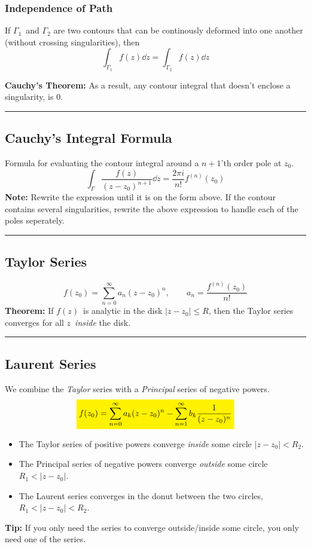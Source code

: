 \documentclass[10pt,a4paper]{article}
\newcommand{\holine}{\rule{286pt}{1pt}}
\newcommand{\yl}[1]{\colorbox{yellow}{$\displaystyle #1$}}
\begin{document}
\begin{multicols}{2}
\subsubsection*{Independence of Path}
If $\Gamma_1$ and $\Gamma_2$ are two contours that can be continously deformed into one another (without crossing singularities), then
\[
    \int_{\Gamma_1} f(z) \dd{z} = \int_{\Gamma_2} f(z) \dd{z}
\]

\textbf{Cauchy's Theorem:} As a result, any contour integral that doesn't enclose a singularity, is 0.


\holine
\subsection*{Cauchy's Integral Formula}
Formula for evaluating the contour integral around a $n+1$'th order pole at $z_0$.
\[
    \int_\Gamma \frac{f(z)}{(z-z_0)^{n+1}}\dd{z} = \frac{2\pi i}{n!}f^{(n)}(z_0)
\]
\textbf{Note:} Rewrite the expression until it is on the form above. If the contour contains several singularities, rewrite the above expression to handle each of the poles seperately.



\holine
\subsection*{Taylor Series}
\[
    f(z_0) = \sum_{n=0}^\infty a_n(z-z_0)^n, \quad\quad a_n = \frac{f^{(n)}(z_0)}{n!}
\]
\textbf{Theorem:} If $f(z)$ is analytic in the disk $|z-z_0| \leq R$, then the Taylor series converges for all $z$ \textit{inside} the disk.


\holine
\subsection*{Laurent Series}
We combine the \textit{Taylor} series with a \textit{Principal} series of negative powers.
\[
\yl{
    f(z_0) = \sum_{n=0}^\infty a_k(z-z_0)^n - \sum_{n=1}^\infty b_k\frac{1}{(z-z_0)^n}
}
\]
\begin{itemize}
    \item The Taylor series of positive powers converge \textit{inside} some circle $|z-z_0| < R_2$.
    \item The Principal series of negative powers converge \textit{outside} some circle $R_1 < |z-z_0|$.
    \item The Laurent series converges in the donut between the two circles, $R_1 < |z-z_0| < R_2$.
\end{itemize}
\textbf{Tip:} If you only need the series to converge outside/inside some circle, you only need one of the series.


\end{multicols}
\end{document}
